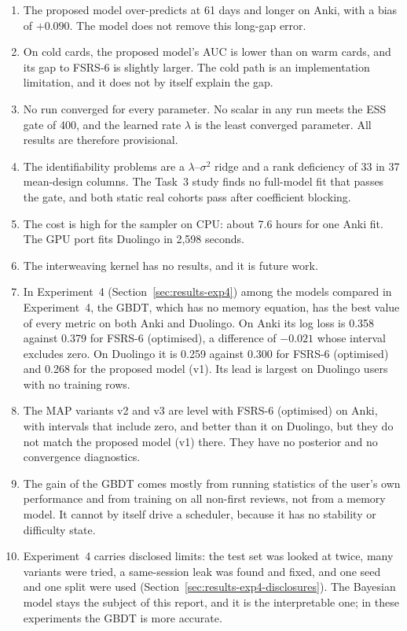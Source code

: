 \begin{enumerate}
    not evidence for the model on its own.
  \item The proposed model over-predicts at 61 days and longer on Anki, with a bias of $+0.090$. The model does not remove
    this long-gap error.
  \item On cold cards, the proposed model's AUC is lower than on warm cards, and its gap to FSRS-6 is slightly larger. The cold path is an implementation limitation, and it does not by itself explain the gap.
  \item No run converged for every parameter. No scalar in any run meets the ESS gate of 400, and the learned rate $\lambda$ is the least converged parameter.
    All results are therefore provisional.
  \item The identifiability problems are a $\lambda$--$\sigma^2$ ridge and a rank deficiency of 33 in 37 mean-design columns. The
    Task~3 study finds no full-model fit that passes the gate, and both static real cohorts pass after coefficient blocking.
  \item The cost is high for the sampler on CPU: about 7.6 hours for one Anki fit. The GPU port fits Duolingo in 2,598 seconds.
  \item The interweaving kernel has no results, and it is future work.
  \item In Experiment~4 (Section~\ref{sec:results-exp4}) among the models compared in Experiment~4, the GBDT, which has no memory equation, has the best value of every metric on both Anki and Duolingo. On Anki its log loss is 0.358 against 0.379 for FSRS-6 (optimised), a difference of $-0.021$ whose interval excludes zero. On Duolingo it is 0.259 against 0.300 for FSRS-6 (optimised) and 0.268 for the proposed model (v1). Its lead is largest on Duolingo users with no training rows.
  \item The MAP variants v2 and v3 are level with FSRS-6 (optimised) on Anki, with intervals that include zero, and better than it on Duolingo, but they do not match the proposed model (v1) there. They have no posterior and no convergence diagnostics.
  \item The gain of the GBDT comes mostly from running statistics of the user's own performance and from training on all non-first reviews, not from a memory model. It cannot by itself drive a scheduler, because it has no stability or difficulty state.
  \item Experiment~4 carries disclosed limits: the test set was looked at twice, many variants were tried, a same-session leak was found and fixed, and one seed and one split were used (Section~\ref{sec:results-exp4-disclosures}). The Bayesian model stays the subject of this report, and it is the interpretable one; in these experiments the GBDT is more accurate.

\end{enumerate}
